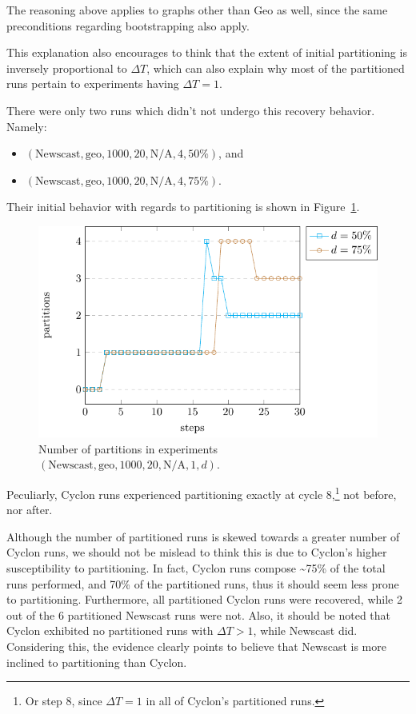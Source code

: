 \documentclass[a4paper]{ifacconf}
\newcommand{\DT}{\ensuremath{{\Delta}T}}
\begin{document}
The reasoning above applies to graphs other than Geo as well, since the same preconditions regarding bootstrapping also apply.

This explanation also encourages to think that the extent of initial partitioning is inversely proportional to \DT, which can also explain why most of the partitioned runs pertain to experiments having $\DT = 1$.

There were only two runs which didn't not undergo this recovery behavior.
Namely:
\begin{itemize}
    \item $(\text{Newscast}, \text{geo}, 1000, 20, \text{N/A}, 4, 50\%)$, and
    \item $(\text{Newscast}, \text{geo}, 1000, 20, \text{N/A}, 4, 75\%)$.
\end{itemize}
Their initial behavior with regards to partitioning is shown in Figure~\ref{fig:unrecovered-runs}.


\begin{figure}
    \centering
    \includegraphics[width=.9\linewidth]{"figures/unrecovered runs"}
    \caption{Number of partitions in experiments $(\text{Newscast}, \text{geo}, 1000, 20, \text{N/A}, 1, d).$}
    \label{fig:unrecovered-runs}
\end{figure}



Peculiarly, Cyclon runs experienced partitioning exactly at cycle 8,\footnote{%
    Or step 8, since $\DT = 1$ in all of Cyclon's partitioned runs.
} not before, nor after.

Although the number of partitioned runs is skewed towards a greater number of Cyclon runs, we should not be mislead to think this is due to Cyclon's higher susceptibility to partitioning.
In fact, Cyclon runs compose \textasciitilde 75\% of the total runs performed, and 70\% of the partitioned runs, thus it should seem less prone to partitioning.
Furthermore, all partitioned Cyclon runs were recovered, while 2 out of the 6 partitioned Newscast runs were not.
Also, it should be noted that Cyclon exhibited no partitioned runs with $\DT > 1$, while Newscast did.
Considering this, the evidence clearly points to believe that Newscast is more inclined to partitioning than Cyclon.
\end{document}
